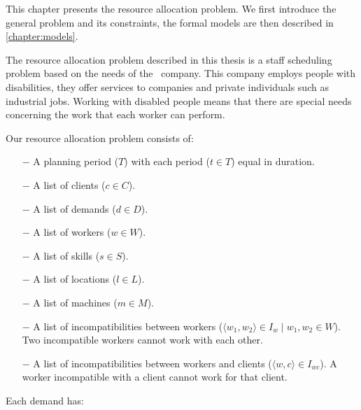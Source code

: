 \documentclass[../thesis.tex]{subfiles}
\begin{document}
This chapter presents the resource allocation problem.
We first introduce the general problem and its constraints, 
the formal models are then described in \autoref{chapter:models}.

The resource allocation problem described in this thesis is a staff scheduling problem based on the needs of the \vone\ company. 
This company employs people with disabilities, they offer services to companies and private individuals such 
as industrial jobs. Working with disabled people means that there are special needs concerning
the work that each worker can perform.


Our resource allocation problem consists of:

\begin{itemize}
  \item[$-$] A planning period ($T$) with each period ($t \in T$) equal in duration.
  \item[$-$] A list of clients ($c \in C$). 
  \item[$-$] A list of demands ($d \in D$).
  \item[$-$] A list of workers ($w \in W$). 
  \item[$-$] A list of skills ($s \in S$).
  \item[$-$] A list of locations ($l \in L$).
  \item[$-$] A list of machines ($m \in M$).
  \item[$-$] A list of incompatibilities between workers ($\langle w_1, w_2\rangle \in I_{w} \mid w_1, w_2 \in W$).
  Two incompatible workers cannot work with each other.  
  \item[$-$] A list of incompatibilities between workers and clients ($\langle w, c\rangle \in I_{wc}$).
  A worker incompatible with a client cannot work for that client.
\end{itemize}

Each demand has:
\end{document}
